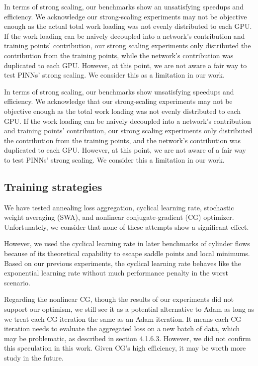In terms of strong scaling, our benchmarks show an unsatisfying speedups and efficiency.
We acknowledge our strong-scaling experiments may not be objective enough as the actual total work loading was not evenly distributed to each GPU.
If the work loading can be naively decoupled into a network's contribution and training points' contribution, our strong scaling experiments only distributed the contribution from the training points, while the network's contribution was duplicated to each GPU.
However, at this point, we are not aware a fair way to test PINNs' strong scaling.
We consider this as a limitation in our work.

In terms of strong scaling, our benchmarks show unsatisfying speedups and efficiency.
We acknowledge that our strong-scaling experiments may not be objective enough as the total work loading was not evenly distributed to each GPU.
If the work loading can be naively decoupled into a network's contribution and training points' contribution, our strong scaling experiments only distributed the contribution from the training points, and the network's contribution was duplicated to each GPU.
However, at this point, we are not aware of a fair way to test PINNs' strong scaling.
We consider this a limitation in our work.

\subsection*{Training strategies}

We have tested annealing loss aggregation, cyclical learning rate, stochastic weight averaging (SWA), and nonlinear conjugate-gradient (CG) optimizer.
Unfortunately, we consider that none of these attempts show a significant effect.

However, we used the cyclical learning rate in later benchmarks of cylinder flows because of its theoretical capability to escape saddle points and local minimums.
Based on our previous experiments, the cyclical learning rate behaves like the exponential learning rate without much performance penalty in the worst scenario.

Regarding the nonlinear CG, though the results of our experiments did not support our optimism, we still see it as a potential alternative to Adam as long as we treat each CG iteration the same as an Adam iteration.
It means each CG iteration needs to evaluate the aggregated loss on a new batch of data, which may be problematic, as described in section 4.1.6.3. 
However, we did not confirm this speculation in this work.
Given CG's high efficiency, it may be worth more study in the future.

